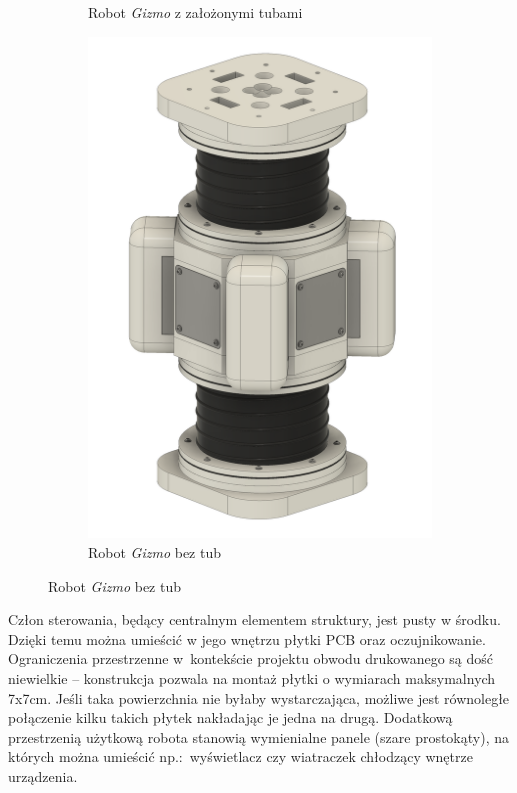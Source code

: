 \begin{figure}[ht!]
\begin{subfigure}[b]{0.45\textwidth}
            \caption{Robot \textit{Gizmo} z założonymi tubami}
            \label{fig: gizmo_module}
        \end{subfigure}
        \hfill
        \begin{subfigure}[b]{0.45\textwidth}
            \centering
            \includegraphics[width=\textwidth]{rysunki/gizmo/module_tube.png}
            \caption{Robot \textit{Gizmo} bez tub}
            \label{fig: gizmo_module_notube}
        \end{subfigure}
    \end{figure} 

Człon sterowania, będący centralnym elementem struktury, jest pusty w środku. Dzięki temu można umieścić w jego wnętrzu płytki PCB oraz oczujnikowanie. Ograniczenia przestrzenne w~kontekście projektu obwodu drukowanego są dość niewielkie -- konstrukcja pozwala na montaż płytki o wymiarach maksymalnych 7x7cm. Jeśli taka powierzchnia nie byłaby wystarczająca, możliwe jest równoległe połączenie kilku takich płytek nakładając je jedna na drugą. Dodatkową przestrzenią użytkową robota stanowią wymienialne panele (szare prostokąty), na których można umieścić np.:~wyświetlacz czy wiatraczek chłodzący wnętrze urządzenia.


